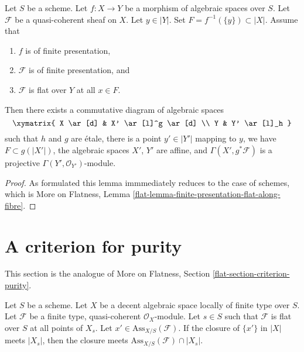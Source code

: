 \begin{lemma}
\label{lemma-finite-presentation-flat-along-fibre}
Let $S$ be a scheme.
Let $f : X \to Y$ be a morphism of algebraic spaces over $S$.
Let $\mathcal{F}$ be a quasi-coherent sheaf on $X$.
Let $y \in |Y|$. Set $F = f^{-1}(\{y\}) \subset |X|$. Assume that
\begin{enumerate}
\item $f$ is of finite presentation,
\item $\mathcal{F}$ is of finite presentation, and
\item $\mathcal{F}$ is flat over $Y$ at all $x \in F$.
\end{enumerate}
Then there exists a commutative diagram of algebraic spaces
$$
\xymatrix{
X \ar[d] & X' \ar[l]^g \ar[d] \\
Y & Y' \ar[l]_h
}
$$
such that $h$ and $g$ are \'etale, there is a point
$y' \in |Y'|$ mapping to $y$, we have $F \subset g(|X'|)$,
the algebraic spaces $X'$, $Y'$ are affine, and
$\Gamma(X', g^*\mathcal{F})$ is a projective
$\Gamma(Y', \mathcal{O}_{Y'})$-module.
\end{lemma}

\begin{proof}
As formulated this lemma immmediately reduces
to the case of schemes, which is
More on Flatness, Lemma
\ref{flat-lemma-finite-presentation-flat-along-fibre}.
\end{proof}




\section{A criterion for purity}
\label{section-criterion-purity}

\noindent
This section is the analogue of More on Flatness, Section
\ref{flat-section-criterion-purity}.

\begin{lemma}
\label{lemma-associated-point-specializes}
Let $S$ be a scheme. Let $X$ be a decent algebraic space
locally of finite type over $S$.
Let $\mathcal{F}$ be a finite type, quasi-coherent $\mathcal{O}_X$-module.
Let $s \in S$ such that $\mathcal{F}$ is flat over $S$ at all points of $X_s$.
Let $x' \in \text{Ass}_{X/S}(\mathcal{F})$. If
the closure of $\{x'\}$ in $|X|$ meets $|X_s|$, then the closure
meets $\text{Ass}_{X/S}(\mathcal{F}) \cap |X_s|$.
\end{lemma}

